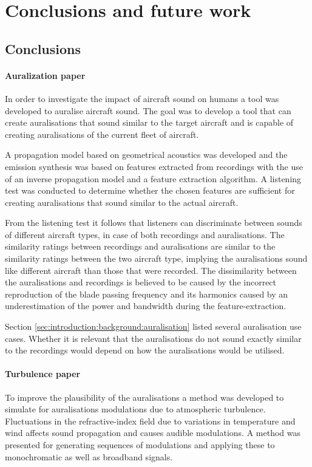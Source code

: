 \chapter{Conclusions and future work}\label{chapter:conclusions}

\section{Conclusions}


\subsubsection{Auralization paper}
In order to investigate the impact of aircraft sound on humans a tool was
developed to auralise aircraft sound. The goal was to develop a tool that can
create auralisations that sound similar to the target aircraft and is capable of
creating auralisations of the current fleet of aircraft.

A propagation model based on geometrical acoustics was developed and the
emission synthesis was based on features extracted from recordings with the use
of an inverse propagation model and a feature extraction algorithm. A listening
test was conducted to determine whether the chosen features are sufficient for
creating auralisations that sound similar to the actual aircraft.

From the listening test it follows that listeners can discriminate between
sounds of different aircraft types, in case of both recordings and
auralisations. The similarity ratings between recordings and auralisations are
similar to the similarity ratings between the two aircraft type, implying the
auralisations sound like different aircraft than those that were recorded.
The dissimilarity between the auralisations and recordings is believed to be
caused by the incorrect reproduction of the blade passing frequency and its
harmonics caused by an underestimation of the power and bandwidth during the
feature-extraction.

Section \ref{sec:introduction:background:auralisation} listed several
auralisation use cases. Whether it is relevant that the auralisations do not
sound exactly similar to the recordings would depend on how the auralisations
would be utilised.

\subsubsection{Turbulence paper}
To improve the plausibility of the auralisations
a method was developed to simulate for auralisations modulations
due to atmospheric turbulence. Fluctuations in the refractive-index field due to
variations in temperature and wind affects sound propagation and causes audible
modulations. A method was presented for generating sequences of modulations and
applying these to monochromatic as well as broadband signals.

